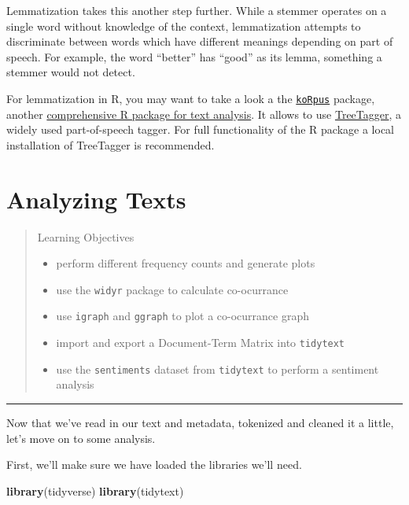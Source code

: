 \documentclass[]{book}
\newenvironment{Shaded}{\begin{snugshade}}{\end{snugshade}}
\newcommand{\KeywordTok}[1]{\textcolor[rgb]{0.13,0.29,0.53}{\textbf{#1}}}
\newcommand{\NormalTok}[1]{#1}
\providecommand{\tightlist}{%
  \setlength{\itemsep}{0pt}\setlength{\parskip}{0pt}}
\begin{document}
Lemmatization takes this another step further. While a stemmer operates on a single word without knowledge of the context, lemmatization attempts to discriminate between words which have different meanings depending on part of speech. For example, the word ``better'' has ``good'' as its lemma, something a stemmer would not detect.

For lemmatization in R, you may want to take a look a the \href{https://CRAN.R-project.org/package=koRpus}{\texttt{koRpus}} package, another \href{https://cran.r-project.org/web/packages/koRpus/vignettes/koRpus_vignette.html}{comprehensive R package for text analysis}. It allows to use \href{http://www.cis.uni-muenchen.de/~schmid/tools/TreeTagger/}{TreeTagger}, a widely used part-of-speech tagger. For full functionality of the R package a local installation of TreeTagger is recommended.

\hypertarget{textanalysis}{%
\chapter{Analyzing Texts}\label{textanalysis}}

\begin{quote}
Learning Objectives

\begin{itemize}
\tightlist
\item
  perform different frequency counts and generate plots
\item
  use the \texttt{widyr} package to calculate co-ocurrance
\item
  use \texttt{igraph} and \texttt{ggraph} to plot a co-ocurrance graph
\item
  import and export a Document-Term Matrix into \texttt{tidytext}
\item
  use the \texttt{sentiments} dataset from \texttt{tidytext} to perform a sentiment analysis
\end{itemize}
\end{quote}

\begin{center}\rule{0.5\linewidth}{\linethickness}\end{center}

Now that we've read in our text and metadata, tokenized and cleaned it a little, let's move on to some analysis.

First, we'll make sure we have loaded the libraries we'll need.

\begin{Shaded}
\begin{Highlighting}[]
\KeywordTok{library}\NormalTok{(tidyverse)}
\KeywordTok{library}\NormalTok{(tidytext)}
\end{Highlighting}
\end{Shaded}
\end{document}

